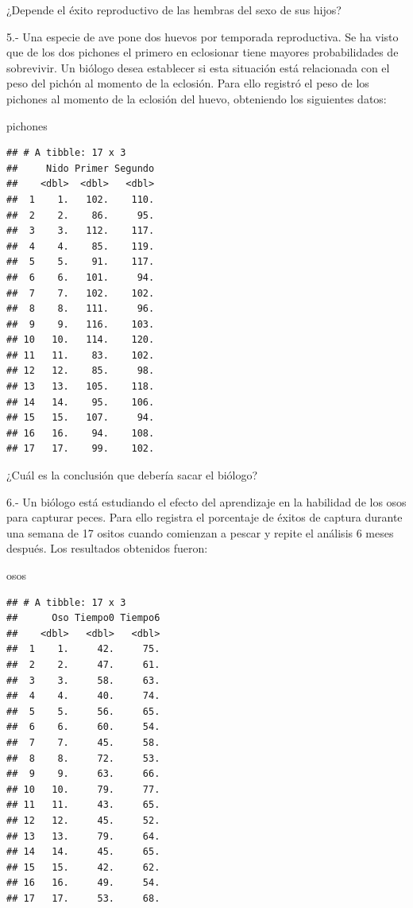 \documentclass[]{book}
\newenvironment{Shaded}{\begin{snugshade}}{\end{snugshade}}
\newcommand{\NormalTok}[1]{#1}
\theoremstyle{definition}
\theoremstyle{definition}
\theoremstyle{definition}
\theoremstyle{remark}
\begin{document}
¿Depende el éxito reproductivo de las hembras del sexo de sus hijos?

5.- Una especie de ave pone dos huevos por temporada reproductiva. Se ha
visto que de los dos pichones el primero en eclosionar tiene mayores
probabilidades de sobrevivir. Un biólogo desea establecer si esta
situación está relacionada con el peso del pichón al momento de la
eclosión. Para ello registró el peso de los pichones al momento de la
eclosión del huevo, obteniendo los siguientes datos:

\begin{Shaded}
\begin{Highlighting}[]
\NormalTok{pichones}
\end{Highlighting}
\end{Shaded}

\begin{verbatim}
## # A tibble: 17 x 3
##     Nido Primer Segundo
##    <dbl>  <dbl>   <dbl>
##  1    1.   102.    110.
##  2    2.    86.     95.
##  3    3.   112.    117.
##  4    4.    85.    119.
##  5    5.    91.    117.
##  6    6.   101.     94.
##  7    7.   102.    102.
##  8    8.   111.     96.
##  9    9.   116.    103.
## 10   10.   114.    120.
## 11   11.    83.    102.
## 12   12.    85.     98.
## 13   13.   105.    118.
## 14   14.    95.    106.
## 15   15.   107.     94.
## 16   16.    94.    108.
## 17   17.    99.    102.
\end{verbatim}

¿Cuál es la conclusión que debería sacar el biólogo?

6.- Un biólogo está estudiando el efecto del aprendizaje en la habilidad
de los osos para capturar peces. Para ello registra el porcentaje de
éxitos de captura durante una semana de 17 ositos cuando comienzan a
pescar y repite el análisis 6 meses después. Los resultados obtenidos
fueron:

\begin{Shaded}
\begin{Highlighting}[]
\NormalTok{osos}
\end{Highlighting}
\end{Shaded}

\begin{verbatim}
## # A tibble: 17 x 3
##      Oso Tiempo0 Tiempo6
##    <dbl>   <dbl>   <dbl>
##  1    1.     42.     75.
##  2    2.     47.     61.
##  3    3.     58.     63.
##  4    4.     40.     74.
##  5    5.     56.     65.
##  6    6.     60.     54.
##  7    7.     45.     58.
##  8    8.     72.     53.
##  9    9.     63.     66.
## 10   10.     79.     77.
## 11   11.     43.     65.
## 12   12.     45.     52.
## 13   13.     79.     64.
## 14   14.     45.     65.
## 15   15.     42.     62.
## 16   16.     49.     54.
## 17   17.     53.     68.
\end{verbatim}
\end{document}
